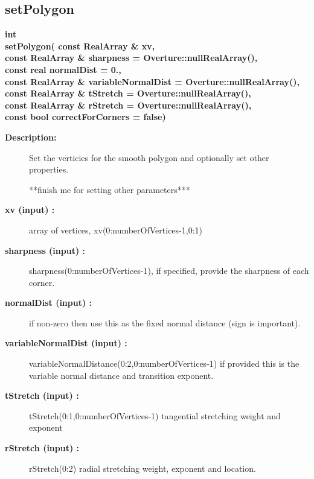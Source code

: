 \subsection{setPolygon}
 
\newlength{\SmoothedPolygonMappingIncludeArgIndent}
\begin{flushleft} \textbf{%
int  \\ 
\settowidth{\SmoothedPolygonMappingIncludeArgIndent}{setPolygon(}%
setPolygon( const RealArray \& xv,\\ 
const RealArray \& sharpness  = Overture::nullRealArray(),\\ 
\hspace{\SmoothedPolygonMappingIncludeArgIndent}const real normalDist  = 0.,\\ 
const RealArray \& variableNormalDist  = Overture::nullRealArray(),\\ 
const RealArray \& tStretch  = Overture::nullRealArray(),\\ 
const RealArray \& rStretch  = Overture::nullRealArray(),\\ 
\hspace{\SmoothedPolygonMappingIncludeArgIndent}const bool correctForCorners  = false)
}\end{flushleft}
 
\begin{description}
\item[{\bf Description:}] 
     Set the verticies for the smooth polygon and optionally set other properties.
 
   **finish me for setting other parameters***  
 
\item[{\bf xv (input) :}]  array of vertices, xv(0:numberOfVertices-1,0:1)
\item[{\bf sharpness (input) :}]  sharpness(0:numberOfVertices-1), if specified, provide the sharpness of each corner.
\item[{\bf normalDist (input) :}]  if non-zero then use this as the fixed normal distance (sign is important).
\item[{\bf variableNormalDist (input) :}]  variableNormalDistance(0:2,0:numberOfVertices-1) if provided this is
     the variable normal distance and transition exponent.
\item[{\bf tStretch (input) :}]  tStretch(0:1,0:numberOfVertices-1) tangential stretching weight and exponent
\item[{\bf rStretch (input) :}]  rStretch(0:2) radial stretching weight, exponent and location.

\end{description}
